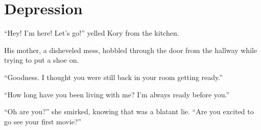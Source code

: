 \chapter*{Depression}


``Hey! I'm here! Let's go!'' yelled Kory from the kitchen.

His mother, a disheveled mess, hobbled through the door from the hallway while trying to put a shoe on.

``Goodness. I thought you were still back in your room getting ready.''

``How long have you been living with me? I'm always ready before you.''

``Oh are you?'' she smirked, knowing that was a blatant lie. ``Are you excited to go see your first movie?''


